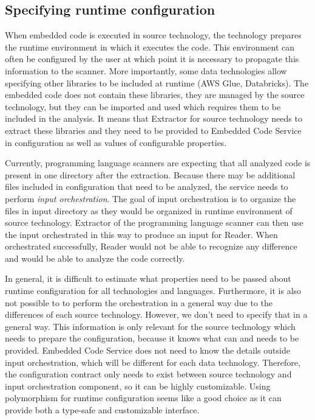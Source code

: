 \subsection{Specifying runtime configuration}
When embedded code is executed in source technology, the technology prepares the runtime environment in which it executes the code. This environment can often be configured by the user at which point it is necessary to propagate this information to the scanner. More importantly, some data technologies allow specifying other libraries to be included at runtime (AWS Glue, Databricks). The embedded code does not contain these libraries, they are managed by the source technology, but they can be imported and used which requires them to be included in the analysis. It means that Extractor for source technology needs to extract these libraries and they need to be provided to Embedded Code Service in configuration as well as values of configurable properties.
\par
Currently, programming language scanners are expecting that all analyzed code is present in one directory after the extraction. Because there may be additional files included in configuration that need to be analyzed, the service needs to perform \textit{input orchestration}. The goal of input orchestration is to organize the files in input directory as they would be organized in runtime environment of source technology. Extractor of the programming language scanner can then use the input orchestrated in this way to produce an input for Reader. When orchestrated successfully, Reader would not be able to recognize any difference and would be able to analyze the code correctly.
\par
In general, it is difficult to estimate what properties need to be passed about runtime configuration for all technologies and languages. Furthermore, it is also not possible to to perform the orchestration in a general way due to the differences of each source technology. However, we don’t need to specify that in a general way. This information is only relevant for the source technology which needs to prepare the configuration, because it knows what can and needs to be provided. Embedded Code Service does not need to know the details outside input orchestration, which will be different for each data technology. Therefore, the configuration contract only needs to exist between source technology and input orchestration component, so it can be highly customizable. Using polymorphism for runtime configuration seems like a good choice as it can provide both a type-safe and customizable interface.

